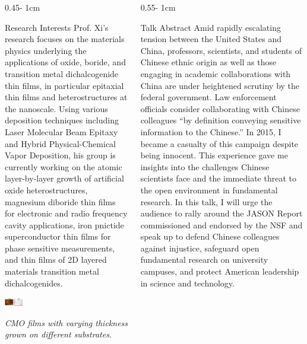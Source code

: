 \documentclass{../psuposter}
\begin{document}
\begin{frame}
\begin{columns}[t, totalwidth=\textwidth]
\begin{column}{0.45\textwidth - 1cm}
    \begin{block}{Research Interests}
        Prof. Xi’s research focuses on the materials physics underlying the applications of oxide, boride, and transition metal dichalcogenide thin films, in particular epitaxial thin films and heterostructures at the nanoscale. Using various deposition techniques including Laser Molecular Beam Epitaxy and Hybrid Physical-Chemical Vapor Deposition, his group is currently working on the atomic layer-by-layer growth of artificial oxide heterostructures, magnesium diboride thin films for electronic and radio frequency cavity applications, iron pnictide superconductor thin films for phase sensitive measurements, and thin films of 2D layered materials transition metal dichalcogenides. 
        \begin{center}
	    	\includegraphics[width=0.15\textwidth]{images/research}    
	    	
	    	\textit{CMO films with varying thickness grown on different substrates.} 
    	\end{center}
    	
    \end{block}
\end{column}
\begin{column}{0.55\textwidth - 1cm}


    \begin{block}{Talk Abstract}
    	Amid rapidly escalating tension between the United States and China, professors, scientists, and students of Chinese ethnic origin as well as those engaging in academic collaborations with China are under heightened scrutiny by the federal government. Law enforcement officials consider collaborating with Chinese colleagues “by definition conveying sensitive information to the Chinese.” In 2015, I became a casualty of this campaign despite being innocent. This experience gave me insights into the challenges Chinese scientists face and the immediate threat to the open environment in fundamental research. In this talk, I will urge the audience to rally around the JASON Report commissioned and endorsed by the NSF and speak up to defend Chinese colleagues against injustice, safeguard open fundamental research on university campuses, and protect American leadership in science and technology.
    \end{block}



\end{column}
\end{columns}
\end{frame}
\end{document}
